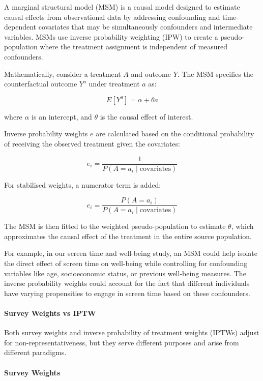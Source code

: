 \documentclass[
  singlecolumn]{article}
\let\oldparagraph\paragraph
\renewcommand{\paragraph}[1]{\oldparagraph{#1}\mbox{}}
\begin{document}
A marginal structural model (MSM) is a causal model designed to estimate
causal effects from observational data by addressing confounding and
time-dependent covariates that may be simultaneously confounders and
intermediate variables. MSMs use inverse probability weighting (IPW) to
create a pseudo-population where the treatment assignment is independent
of measured confounders.

Mathematically, consider a treatment \(A\) and outcome \(Y\). The MSM
specifies the counterfactual outcome \(Y^a\) under treatment \(a\) as:

\[
E[Y^a] = \alpha + \theta a
\]

where \(\alpha\) is an intercept, and \(\theta\) is the causal effect of
interest.

Inverse probability weights \(e\) are calculated based on the
conditional probability of receiving the observed treatment given the
covariates:

\[
e_i = \frac{1}{P(A=a_i \mid \text{covariates})}
\]

For stabilised weights, a numerator term is added:

\[
e_i = \frac{P(A=a_i)}{P(A=a_i \mid \text{covariates})}
\]

The MSM is then fitted to the weighted pseudo-population to estimate
\(\theta\), which approximates the causal effect of the treatment in the
entire source population.

For example, in our screen time and well-being study, an MSM could help
isolate the direct effect of screen time on well-being while controlling
for confounding variables like age, socioeconomic status, or previous
well-being measures. The inverse probability weights could account for
the fact that different individuals have varying propensities to engage
in screen time based on these confounders.

\paragraph{Survey Weights vs IPTW}\label{survey-weights-vs-iptw}

Both survey weights and inverse probability of treatment weights (IPTWs)
adjust for non-representativeness, but they serve different purposes and
arise from different paradigms.

\paragraph{\texorpdfstring{\textbf{Survey
Weights}}{Survey Weights}}\label{survey-weights}
\end{document}
